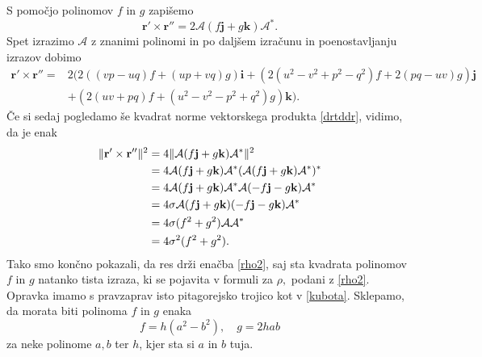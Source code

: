 \documentclass[12pt,a4paper,twoside]{article}
\theoremstyle{definition} %
\theoremstyle{plain} %
\theoremstyle{primerstyle}
\numberwithin{equation}{section}  %
\newcommand{\rV}{\mathbf{r}}
\newcommand{\iV}{\mathbf{i}}
\newcommand{\jV}{\mathbf{j}}
\newcommand{\kV}{\mathbf{k}}
\newcommand{\AQ}{\mathcal{A}}
\begin{document}
 S pomočjo polinomov $f$ in $g$ zapišemo
\begin{equation}
	\label{drtddr}
	\rV'\times\rV''=2\AQ(f\jV+g\kV)\AQ^*.
\end{equation}
Spet izrazimo $\AQ$ z znanimi polinomi in po daljšem izračunu in poenostavljanju izrazov dobimo
\begin{align*}
	\rV'\times\rV''=&2 \big (2((vp-uq)f+(up+vq)g)\iV+(2(u^2-v^2+p^2-q^2)f+2(pq-uv)g)\jV \\
	&+(2(uv+pq)f+(u^2-v^2-p^2+q^2)g)\kV \big ).
\end{align*}
Če si sedaj pogledamo še kvadrat norme vektorskega produkta \eqref{drtddr}, vidimo, da je enak
\begin{align}
	\lVert\rV'\times\rV''\rVert^2&=4\lVert\AQ(f\jV+g\kV)\AQ^*\rVert^2\notag\\
	&=4\AQ(f\jV+g\kV)\AQ^*(\AQ(f\jV+g\kV)\AQ^*)^*\notag\\
	&=4\AQ(f\jV+g\kV)\AQ^*\AQ(-f\jV-g\kV)\AQ^*\\
	&=4\sigma\AQ(f\jV+g\kV)(-f\jV-g\kV)\AQ^*\notag\\
	&=4\sigma(f^2+g^2)\AQ\AQ^*\notag\\
	&=4\sigma^2(f^2+g^2).\notag
\end{align}
Tako smo končno pokazali, da res drži enačba \eqref{rho2}, saj sta kvadrata polinomov $f$ in $g$ natanko tista izraza, ki se pojavita v formuli za $\rho,$ podani z \eqref{rho2}. Opravka imamo s pravzaprav isto pitagorejsko trojico kot v \eqref{kubota}. Sklepamo, da morata biti polinoma $f$ in $g$ enaka
\begin{equation}
	\label{polinoma_f_in_g}
	f=h(a^2-b^2),\quad g=2hab
\end{equation}
za neke polinome $a,b$ ter $h$, kjer sta si $a$ in $b$ tuja.
\end{document}
